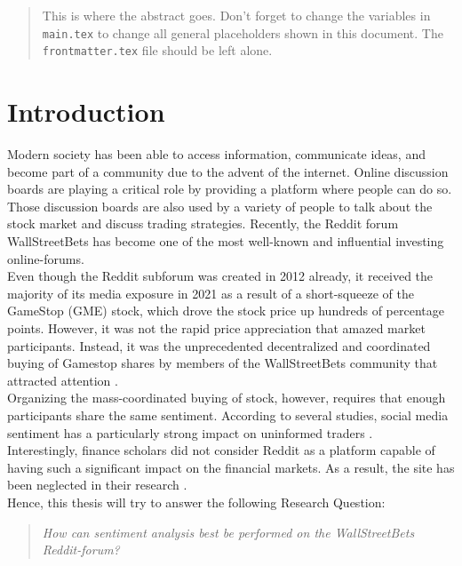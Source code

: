 \documentclass[11pt, a4paper]{article}
\begin{document}


\begin{abstract}
This is where the abstract goes. Don't forget to change the variables in \texttt{main.tex} to change all general placeholders shown in this document. The \texttt{frontmatter.tex} file should be left alone.
\end{abstract}

\section{Introduction} \label{sec:introduction}

Modern society has been able to access information, communicate ideas, and become part of a community due to the advent of the internet. 
Online discussion boards are playing a critical role by providing a platform where people can do so. Those discussion boards are also used by a 
variety of people to talk about the stock market and discuss trading strategies. Recently, the Reddit forum WallStreetBets has become one of 
the most well-known and influential investing online-forums.
\\
Even though the Reddit subforum was created in 2012 already, it received the majority of its media exposure in 2021 as a result of a short-squeeze 
of the GameStop (GME) stock, which drove the stock price up hundreds of percentage points. However, it was not the rapid price appreciation that 
amazed market participants. Instead, it was the unprecedented decentralized and coordinated buying of Gamestop shares by members of the WallStreetBets 
community that attracted attention \citep{anand2021WallstreetbetsAgainstWallstreet}.
\\
Organizing the mass-coordinated buying of stock, however, requires that enough participants share the same sentiment. According to several studies, 
social media sentiment has a particularly strong impact on uninformed traders \citep{danbolt2015InvestorSentiment}.
\\
Interestingly, finance scholars did not consider Reddit as a platform capable of having such a significant impact on the financial markets. 
As a result, the site has been neglected in their research \citep{long2021LikeTheStock}.
\\
Hence, this thesis will try to answer the following Research Question:
\begin{quote}
\emph{How can sentiment analysis best be performed on the WallStreetBets Reddit-forum?}
\end{quote}
\end{document}
